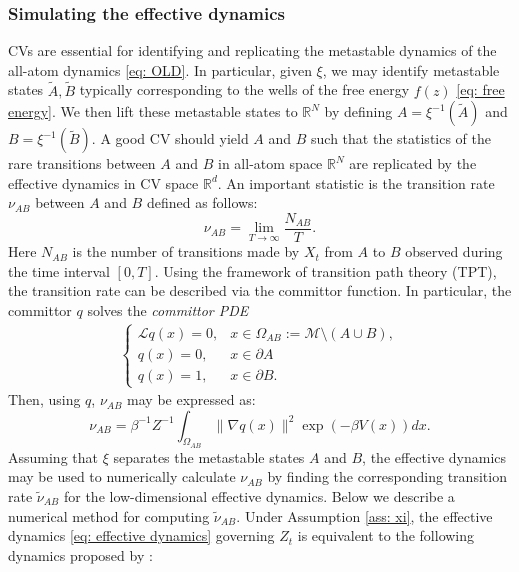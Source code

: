\documentclass[reqno, 12pt]{article}
\begin{document}
\subsubsection{Simulating the effective dynamics} 
\label{subsec: simulating the effective dynamics}
CVs are essential for identifying and replicating the metastable dynamics of the all-atom dynamics \eqref{eq: OLD}. In particular, given $\xi$, we may identify metastable states $\tilde{A}, \tilde{B}$ typically corresponding to the wells of the free energy $f(z)$ \eqref{eq: free energy}. We then lift these metastable states to $\mathbb{R}^{N}$ by defining $A = \xi^{-1}(\tilde{A})$ and $B = \xi^{-1}(\tilde{B})$. A good CV should yield $A$ and $B$ such that the statistics of the rare transitions between $A$ and $B$ in all-atom space $\mathbb{R}^{N}$ are replicated by the effective dynamics in CV space $\mathbb{R}^{d}$. An important statistic is the transition rate $\nu_{AB}$ between $A$ and $B$ defined as follows:
\begin{equation}
\label{nuAB}
\nu_{AB} = \lim_{T\rightarrow\infty}\frac{N_{AB}}{T}.
\end{equation} 
Here $N_{AB}$ is the number of transitions made by $X_t$ from $A$ to $B$ observed during the time interval $[0,T]$. Using the framework of transition path theory (TPT)\cite{weinan2006towards}, the transition rate can be described via the committor function. In particular, the committor $q$ solves the \emph{committor PDE}
\begin{align}
\begin{cases}
   \mathcal{L}q(x) = 0, & x \in\Omega_{AB}:= \mathcal{M} \setminus (A\cup B), \\
   q(x) = 0, &x\in \partial A\\
    q(x) = 1,& x\in \partial B. 
   \end{cases}\label{eq: committor pde}
\end{align}
Then, using $q$, $\nu_{AB}$ may be expressed as: 
\begin{equation}
    \nu_{AB} = \beta^{-1} Z^{-1} \int_{\Omega_{AB} }\|\nabla q(x)\|^2\exp(-\beta V(x))dx. \label{eq: transition rate}
\end{equation}
Assuming that $\xi$ separates the metastable states $A$ and $B$, the effective dynamics may be used to numerically calculate $\nu_{AB}$ by finding the corresponding transition rate $\tilde{\nu}_{AB}$ for the low-dimensional effective dynamics. Below we describe a numerical method for computing $\tilde{\nu}_{AB}$.  Under Assumption \ref{ass: xi}, the effective dynamics \eqref{eq: effective dynamics} governing $Z_t$ is equivalent to the following dynamics proposed by \cite{maragliano2006string}: 
\end{document}
